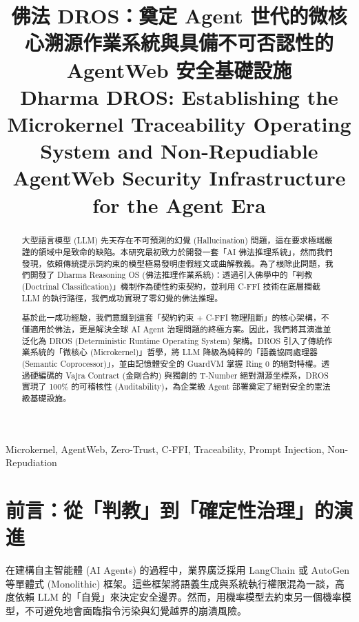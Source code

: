 \documentclass[conference]{IEEEtran}
\begin{document}
\title{佛法 DROS：奠定 Agent 世代的微核心溯源作業系統與具備不可否認性的 AgentWeb 安全基礎設施\\
{\Large Dharma DROS: Establishing the Microkernel Traceability Operating System and Non-Repudiable AgentWeb Security Infrastructure for the Agent Era}
}

\author{
}

\maketitle

\begin{abstract}
大型語言模型 (LLM) 先天存在不可預測的幻覺 (Hallucination) 問題，這在要求極端嚴謹的領域中是致命的缺陷。本研究最初致力於開發一套「AI 佛法推理系統」，然而我們發現，依賴傳統提示詞約束的模型極易發明虛假經文或曲解教義。為了根除此問題，我們開發了 Dharma Reasoning OS (佛法推理作業系統)：透過引入佛學中的「判教 (Doctrinal Classification)」機制作為硬性約束契約，並利用 C-FFI 技術在底層攔截 LLM 的執行路徑，我們成功實現了零幻覺的佛法推理。

基於此一成功經驗，我們意識到這套「契約約束 + C-FFI 物理阻斷」的核心架構，不僅適用於佛法，更是解決全球 AI Agent 治理問題的終極方案。因此，我們將其演進並泛化為 DROS (Deterministic Runtime Operating System) 架構。DROS 引入了傳統作業系統的「微核心 (Microkernel)」哲學，將 LLM 降級為純粹的「語義協同處理器 (Semantic Coprocessor)」，並由記憶體安全的 GuardVM 掌握 Ring 0 的絕對特權。透過硬編碼的 Vajra Contract (金剛合約) 與獨創的 T-Number 絕對溯源坐標系，DROS 實現了 100\% 的可稽核性 (Auditability)，為企業級 Agent 部署奠定了絕對安全的憲法級基礎設施。
\end{abstract}

\begin{IEEEkeywords}
Microkernel, AgentWeb, Zero-Trust, C-FFI, Traceability, Prompt Injection, Non-Repudiation
\end{IEEEkeywords}

\section{前言：從「判教」到「確定性治理」的演進}
在建構自主智能體 (AI Agents) 的過程中，業界廣泛採用 LangChain 或 AutoGen 等單體式 (Monolithic) 框架。這些框架將語義生成與系統執行權限混為一談，高度依賴 LLM 的「自覺」來決定安全邊界。然而，用機率模型去約束另一個機率模型，不可避免地會面臨指令污染與幻覺越界的崩潰風險。
\end{document}
